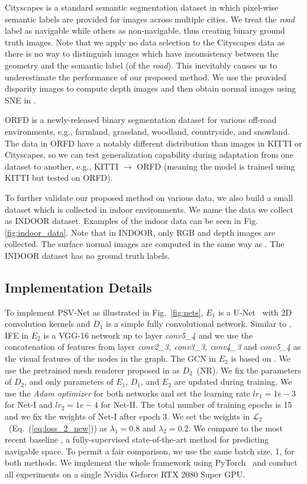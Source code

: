 \documentclass[letterpaper, 10 pt, journal, twoside]{ieeetran}
\begin{document}
Cityscapes \cite{cordts2015cityscapes} is a standard semantic segmentation dataset in which pixel-wise semantic labels are provided for images across multiple cities. We treat the \textit{road} label as navigable while others as non-navigable, thus creating binary ground truth images.  Note that we apply no data selection to the Cityscapes data as there is no way to distinguish images which have inconsistency between the geometry and the semantic label (of the \textit{road}). This inevitably causes us to underestimate the performance of our proposed method. We use the provided disparity images to compute depth images and then obtain normal images using SNE in \cite{fan2020sne}.


ORFD \cite{min2022orfd} is a newly-released binary segmentation dataset for various off-road environments, e.g., farmland, grassland, woodland, countryside, and snowland. The data in ORFD have a notably different distribution than images in KITTI or Cityscapes, so we can test  generalization capability during adaptation from one dataset to another, e.g., KITTI $\rightarrow$ ORFD (meaning the model is trained using KITTI  but tested on ORFD).

To further validate  our proposed method on various data, we also build a small dataset which is collected in indoor environments. We name the data we collect as INDOOR dataset. Examples of the indoor data can be seen in Fig. \ref{fig:indoor_data}. Note that in INDOOR, only RGB and depth images are collected. The surface normal images are computed in the same way as \cite{fan2020sne}. The INDOOR dataset has no ground truth labels.

\subsection{Implementation Details}
To implement  PSV-Net as illustrated in Fig.~\ref{fig:nets}, 
$E_1$ is a U-Net~\cite{ronneberger2015u} with 2D convolution kernels and $D_1$ is a simple fully convolutional network. Similar to \cite{wang2018pixel2mesh}, IFE in $E_2$ is a VGG-16 \cite{simonyan2014very} network up to layer \textit{conv5\_4} and we use the concatenation of features from layer \textit{conv2\_3, conv3\_3, conv4\_3} and \textit{conv5\_4} as the visual features of the nodes in the graph. The GCN in $E_2$ is based on \cite{wang2018pixel2mesh, ling2019fast}. We use the pretrained mesh renderer proposed in \cite{kato2018neural} as  $D_2$~(NR). We fix the parameters of $D_2$, and only parameters of $E_1$, $D_1$, and $E_2$ are updated during training. We use the {\em Adam optimizer} for both networks and set the learning rate $lr_1 = 1e-3$ for  Net-I and $lr_2 = 1e-4$ for  Net-II. The total number of training epochs is 15 and we fix the weights of Net-I after epoch 3. We set the weights in $\mathcal{L}_2$~(Eq.~(\ref{eq:loss_2_new})) as $\lambda_1 = 0.8$ and $\lambda_2 = 0.2$. We compare to the most recent baseline \cite{fan2020sne}, a fully-supervised state-of-the-art method for predicting navigable space. To permit a fair comparison, we use the same batch size, 1, for both methods. We implement the whole framework using PyTorch~\cite{paszke2019pytorch} and conduct all experiments on a single Nvidia Geforce RTX 2080 Super GPU.
\end{document}
